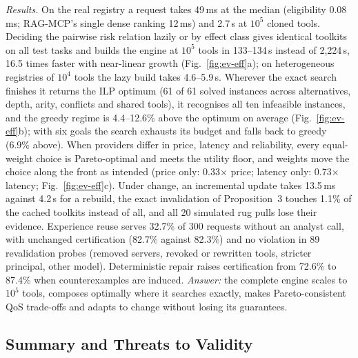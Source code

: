 \emph{Results.} On the real registry a request takes 49\,ms at the median (eligibility 0.08\,ms; RAG-MCP's single
dense ranking 12\,ms) and 2.7\,s at $10^5$ cloned tools. Deciding the pairwise risk relation lazily or by effect
class gives identical toolkits on all test tasks and builds the engine at $10^5$ tools in 133--134\,s instead of
2,224\,s, 16.5 times faster with near-linear growth (Fig.~\ref{fig:ev-eff}a); on heterogeneous registries of
$10^4$ tools the lazy build takes 4.6--5.9\,s. Wherever the exact search finishes it returns the ILP optimum (61 of
61 solved instances across alternatives, depth, arity, conflicts and shared tools), it recognises all ten
infeasible instances, and the greedy regime is 4.4--12.6\% above the optimum on average (Fig.~\ref{fig:ev-eff}b);
with six goals the search exhausts its budget and falls back to greedy (6.9\% above). When providers differ in
price, latency and reliability, every equal-weight choice is Pareto-optimal and meets the utility floor, and
weights move the choice along the front as intended (price only: 0.33$\times$ price; latency only: 0.73$\times$
latency; Fig.~\ref{fig:ev-eff}c). Under change, an incremental update takes 13.5\,ms against 4.2\,s for a rebuild,
the exact invalidation of Proposition~3 touches 1.1\% of the cached toolkits instead of all, and all 20 simulated
rug pulls lose their evidence. Experience reuse serves 32.7\% of 300 requests without an analyst call, with
unchanged certification (82.7\% against 82.3\%) and no violation in 89 revalidation probes (removed servers,
revoked or rewritten tools, stricter principal, other model). Deterministic repair raises certification from
72.6\% to 87.4\% when counterexamples are induced. \emph{Answer:} the complete engine scales to $10^5$ tools,
composes optimally where it searches exactly, makes Pareto-consistent QoS trade-offs and adapts to change without
losing its guarantees.

\subsection{Summary and Threats to Validity}
\label{sec:ev-threats}

